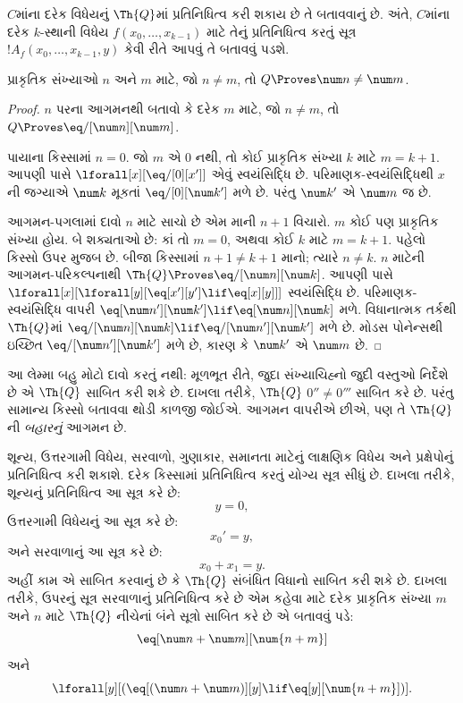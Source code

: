 $C$માંના દરેક વિધેયનું
$\Th{Q}$માં પ્રતિનિધિત્વ
કરી શકાય છે તે
બતાવવાનું છે. અંતે,
$C$માંના દરેક $k$-સ્થાની
વિધેય $f(x_0,\dots,x_{k-1})$
માટે તેનું પ્રતિનિધિત્વ
કરતું સૂત્ર
$!A_f(x_0,\dots,x_{k-1},y)$
કેવી રીતે આપવું
તે બતાવવું પડશે.

\begin{lem}
પ્રાકૃતિક સંખ્યાઓ $n$
અને $m$ માટે, જો
$n \neq m$, તો
$Q \Proves \num
n \neq \num m$.
\end{lem}

\begin{proof}
$n$ પરના આગમનથી
બતાવો કે દરેક $m$
માટે, જો $n \neq m$,
તો $Q \Proves \eq/[\num n][\num m]$.

પાયાના કિસ્સામાં
$n = 0$. જો $m$
એ $0$ નથી, તો
કોઈ પ્રાકૃતિક
સંખ્યા $k$ માટે
$m = k + 1$.
આપણી પાસે
$\lforall[x][\eq/[0][x']]$
એવું સ્વયંસિદ્ધિ છે.
પરિમાણક-સ્વયંસિદ્ધિથી
$x$ની જગ્યાએ
$\num k$ મૂકતાં
$\eq/[0][\num k']$
મળે છે. પરંતુ
$\num k'$ એ
$\num m$ જ છે.

આગમન-પગલામાં
દાવો $n$ માટે સાચો
છે એમ માની $n+1$
વિચારો. $m$ કોઈ
પણ પ્રાકૃતિક
સંખ્યા હોય. બે
શક્યતાઓ છે:
કાં તો $m = 0$,
અથવા કોઈ $k$
માટે $m = k+1$.
પહેલો કિસ્સો
ઉપર મુજબ છે.
બીજા કિસ્સામાં
$n+1 \neq k+1$
માનો; ત્યારે
$n \neq k$.
$n$ માટેની
આગમન-પરિકલ્પનાથી
$\Th{Q} \Proves \eq/[\num n][\num k]$.
આપણી પાસે
$\lforall[x][\lforall[y][\eq[x'][y'] \lif \eq[x][y]]]$
સ્વયંસિદ્ધિ છે.
પરિમાણક-સ્વયંસિદ્ધિ
વાપરી
$\eq[\num n'][\num k'] \lif \eq[\num n][\num
  k]$ મળે. વિધાનાત્મક
તર્કથી $\Th{Q}$માં
$\eq/[\num n][\num k] \lif \eq/[\num n'][\num k']$
મળે છે. મોડસ
પોનેન્સથી ઇચ્છિત
$\eq/[\num n'][\num k']$
મળે છે, કારણ કે
$\num k'$ એ
$\num m$ છે.
\end{proof}

આ લેમ્મા બહુ મોટો
દાવો કરતું નથી:
મૂળભૂત રીતે, જુદા
સંખ્યાચિહ્નો જુદી
વસ્તુઓ નિર્દેશે છે
એ $\Th{Q}$ સાબિત
કરી શકે છે. દાખલા
તરીકે, $\Th{Q}$
$0'' \neq 0'''$
સાબિત કરે છે.
પરંતુ સામાન્ય કિસ્સો
બતાવવા થોડી
કાળજી જોઈએ.
આગમન વાપરીએ
છીએ, પણ તે
$\Th{Q}$ની
\emph{બહારનું}
આગમન છે.

શૂન્ય, ઉત્તરગામી વિધેય, સરવાળો, ગુણાકાર, સમાનતા માટેનું
લાક્ષણિક વિધેય અને પ્રક્ષેપોનું પ્રતિનિધિત્વ કરી શકાશે.
દરેક કિસ્સામાં પ્રતિનિધિત્વ કરતું યોગ્ય સૂત્ર સીધું છે.
દાખલા તરીકે, શૂન્યનું પ્રતિનિધિત્વ આ સૂત્ર કરે છે:
\[
y = 0,
\]
ઉત્તરગામી વિધેયનું આ સૂત્ર કરે છે:
\[
x_0' = y,
\]
અને સરવાળાનું આ સૂત્ર કરે છે:
\[
x_0 + x_1 = y.
\]
અહીં કામ એ સાબિત કરવાનું છે કે $\Th{Q}$ સંબંધિત વિધાનો
સાબિત કરી શકે છે. દાખલા તરીકે, ઉપરનું સૂત્ર સરવાળાનું
પ્રતિનિધિત્વ કરે છે એમ કહેવા માટે દરેક પ્રાકૃતિક સંખ્યા
$m$ અને $n$ માટે $\Th{Q}$ નીચેનાં બંને સૂત્રો સાબિત કરે છે
એ બતાવવું પડે:
\[
\eq[\num n + \num m][\num {n+m}]
\]
અને
\[
\lforall[y][(\eq[(\num n + \num m)][y] \lif \eq[y][\num {n+m}])].
\]

